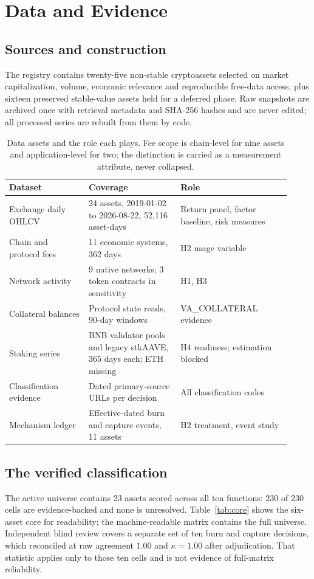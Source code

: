 \documentclass[10pt]{article}
\begin{document}
\section{Data and Evidence}

\subsection{Sources and construction}
The registry contains twenty-five non-stable cryptoassets selected on market capitalization, volume, economic relevance and reproducible free-data access, plus sixteen preserved stable-value assets held for a deferred phase. Raw snapshots are archived once with retrieval metadata and SHA-256 hashes and are never edited; all processed series are rebuilt from them by code.

\begin{table}[ht]
\centering
\small
\begin{tabular}{p{0.26\linewidth}p{0.30\linewidth}p{0.36\linewidth}}
\toprule
Dataset & Coverage & Role \\
\midrule
Exchange daily OHLCV & 24 assets, 2019-01-02 to 2026-08-22, 52,116 asset-days & Return panel, factor baseline, risk measures \\
Chain and protocol fees & 11 economic systems, 362 days & H2 usage variable \\
Network activity & 9 native networks; 3 token contracts in sensitivity & H1, H3 \\
Collateral balances & Protocol state reads, 90-day windows & VA\_COLLATERAL evidence \\
Staking series & BNB validator pools and legacy stkAAVE, 365 days each; ETH missing & H4 readiness; estimation blocked \\
Classification evidence & Dated primary-source URLs per decision & All classification codes \\
Mechanism ledger & Effective-dated burn and capture events, 11 assets & H2 treatment, event study \\
\bottomrule
\end{tabular}
\caption{Data assets and the role each plays. Fee scope is chain-level for nine assets and application-level for two; the distinction is carried as a measurement attribute, never collapsed.}
\end{table}

\subsection{The verified classification}
The active universe contains 23 assets scored across all ten functions: 230 of 230 cells are evidence-backed and none is unresolved. Table~\ref{tab:core} shows the six-asset core for readability; the machine-readable matrix contains the full universe. Independent blind review covers a separate set of ten burn and capture decisions, which reconciled at raw agreement $1.00$ and $\kappa = 1.00$ after adjudication. That statistic applies only to those ten cells and is not evidence of full-matrix reliability.
\end{document}
